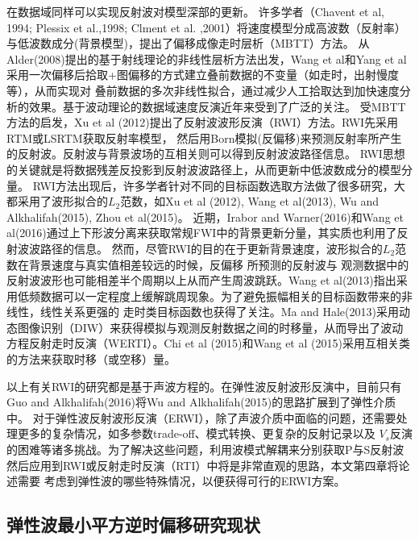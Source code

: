在数据域同样可以实现反射波对模型深部的更新。
许多学者（Chavent et al, 1994\cite{ChaventEtAl1994}; Plessix et al.,1998\cite{PlessixEtAl1998}; Clment et al.
,2001\cite{ClementEtAl2001}）将速度模型分成高波数（反射率）与低波数成分(背景模型)，提出了偏移成像走时层析（MBTT）方法。
从Alder(2008)\cite{Adler2008}提出的基于射线理论的非线性层析方法出发，Wang
et al\cite{WangEtAl2014}和Yang et al\cite{YangEtAl2016}采用一次偏移后拾取+图偏移的方式建立叠前数据的不变量（如走时，出射慢度等），从而实现对
叠前数据的多次非线性拟合，通过减少人工拾取达到加快速度分析的效果。基于波动理论的数据域速度反演近年来受到了广泛的关注。
受MBTT方法的启发，Xu et al
(2012)\cite{xu:2012}提出了反射波波形反演（RWI）方法。RWI先采用RTM或LSRTM获取反射率模型，
然后用Born模拟(反偏移)来预测反射率所产生的反射波。反射波与背景波场的互相关则可以得到反射波波路径信息。
RWI思想的关键就是将数据残差反投影到反射波波路径上，从而更新中低波数成分的模型分量。
RWI方法出现后，许多学者针对不同的目标函数选取方法做了很多研究，大都采用了波形拟合的$L_2$范数，如Xu
et al (2012)\cite{xu:2012}, Wang et al(2013)\cite{Wang2013}, Wu and
Alkhalifah(2015)\cite{Wu2015b},
Zhou et
al(2015)\cite{zhou:2015}。
近期，Irabor and
Warner(2016)\cite{Irabor2016}和Wang et al(2016)\cite{WangFangEtAl2016}通过上下形波分离来获取常规FWI中的背景更新分量，其实质也利用了反射波波路径的信息。
然而，尽管RWI的目的在于更新背景速度，波形拟合的$L_2$范数在背景速度与真实值相差较远的时候，反偏移
所预测的反射波与
观测数据中的反射波波形也可能相差半个周期以上从而产生周波跳跃。Wang et
al(2013)\cite{Wang2013}指出采用低频数据可以一定程度上缓解跳周现象。为了避免振幅相关的目标函数带来的非线性，线性关系更强的
走时类目标函数也获得了关注。Ma and
Hale(2013)\cite{ma2013}采用动态图像识别（DIW）来获得模拟与观测反射数据之间的时移量，从而导出了波动方程反射走时反演（WERTI）。Chi
et al (2015)\cite{chi2015}和Wang et al
(2015)\cite{Wang2015}采用互相关类的方法来获取时移（或空移）量。

以上有关RWI的研究都是基于声波方程的。在弹性波反射波形反演中，目前只有Guo and
Alkhalifah(2016)\cite{Guo2016}将Wu and
Alkhalifah(2015)\cite{Wu2015b}的思路扩展到了弹性介质中。
对于弹性波反射波形反演（ERWI），除了声波介质中面临的问题，还需要处理更多的复杂情况，如多参数trade-off、模式转换、更复杂的反射记录以及
$V_s$反演的困难等诸多挑战。为了解决这些问题，利用波模式解耦来分别获取P与S反射波然后应用到RWI或反射走时反演（RTI）中将是非常直观的思路，本文第四章将论述需要
考虑到弹性波的哪些特殊情况，以便获得可行的ERWI方案。

\subsection{弹性波最小平方逆时偏移研究现状}

